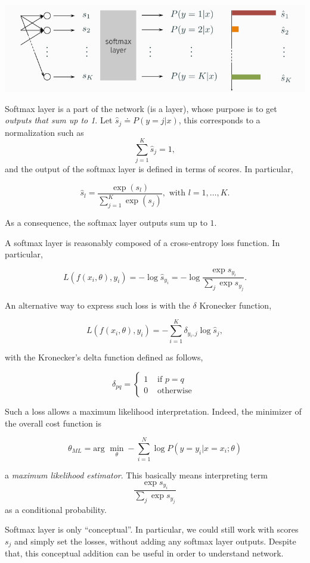 \documentclass[10pt]{report}
\begin{document}
\begin{center}
\includegraphics[width=.9\linewidth]{./pics/cnn/softmax-layer.jpg}
\end{center}

Softmax layer is a part of the network (is a layer), whose purpose is to
get \emph{outputs that sum up to 1}. Let \(\hat{s}_j \doteq P(y = j|x)\),
this corresponds to a normalization such as
\[\sum_{j=1}^K \hat{s}_ j = 1,\] and the output of the softmax layer is
defined in terms of scores. In particular,

\[\hat{s}_l = \frac{\exp{(s_l)}}{\sum_{j=1}^K \exp{(s_j)}}, \mbox{ with } l = 1, \dots, K.\]

As a consequence, the softmax layer outputs sum up to \(1\).

A softmax layer is reasonably composed of a cross-entropy loss function.
In particular,

\[L(f(x_i, \theta), y_i) = -\log{\hat{s}_ {y_i}} = -\log{\frac{\exp{s_{y_i}}}{\sum_j \exp{s_{y_j}}}}.\]

An alternative way to express such loss is with the \(\delta\) Kronecker
function,

\[L(f(x_i, \theta), y_i) = - \sum_{i=1}^K \delta_{y_i, j}\log{\hat{s}_ j},\]

with the Kronecker's delta function defined as follows,

\[\delta_{pq} = \left\{\begin{array}{ll} 1 & \mbox{ if } p = q\\ 0 & \mbox{ otherwise } \end{array}\right.\]

Such a loss allows a maximum likelihood interpretation. Indeed, the
minimizer of the overall cost function is

\[\theta_{ML} = \mbox{arg } \min_\theta -\sum_{i=1}^N \log P(y = y_i|x = x_i; \theta)\]

a \emph{maximum likelihood estimator}. This basically means interpreting term
\[\frac{\exp{s_{y_i}}}{\sum_j \exp{s_{y_j}}}\] as a conditional
probability.

Softmax layer is only ``conceptual''. In particular, we could still work
with scores \(s_j\) and simply set the losses, without adding any
softmax layer outputs. Despite that, this conceptual addition can be
useful in order to understand network.
\end{document}
